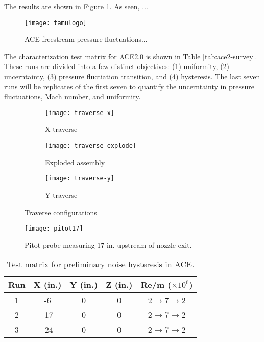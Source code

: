 The results are shown in Figure \ref{fig:ace-survey}. As seen, ...

\begin{figure}[ht!]
    \centering
    \texttt{[image: tamulogo]}
    \caption{ACE freestream pressure fluctuations...}
    \label{fig:ace-survey}
\end{figure}

The characterization test matrix for ACE2.0 is shown in Table \ref{tab:ace2-survey}. These runs are divided into a few distinct objectives: (1) uniformity, (2) uncerntainty, (3) pressure fluctiation transition, and (4) hysteresis. The last seven runs will be replicates of the first seven to quantify the uncerntainty in pressure fluctuations, Mach number, and uniformity.

\begin{figure}[ht!]
    \centering
    \begin{subfigure}[b]{0.4\textwidth}
            \texttt{[image: traverse-x]}
        \caption{X traverse}
        \label{fig:traverse-x}
    \end{subfigure}
    \begin{subfigure}[b]{0.22\textwidth}
            \texttt{[image: traverse-explode]}
        \caption{Exploded assembly}
        \label{fig:traverse-explode}
    \end{subfigure}
    \begin{subfigure}[b]{0.35\textwidth}
            \texttt{[image: traverse-y]}
        \caption{Y-traverse}
        \label{fig:traverse-y}
    \end{subfigure}
    \caption{Traverse configurations}
    \label{fig:traverse}
\end{figure}

\begin{figure}[ht!]
    \centering
    \texttt{[image: pitot17]}
    \caption{Pitot probe measuring 17 in. upstream of nozzle exit.}
    \label{fig:pitot17}
\end{figure}

\begin{table}[ht!]
    \centering
    \begin{tabular}{|c|c|c|c|c|}
        \hline
    \textbf{Run} & \textbf{X (in.)} & \textbf{Y (in.)} & \textbf{Z (in.)} & \textbf{Re/m ($\times10^6$)} \\ \hline
        1 & -6 & 0 & 0 & 2$\to$7$\to$2 \\ \hline
        2 & -17 & 0 & 0 & 2$\to$7$\to$2 \\ \hline
        3 & -24 & 0 & 0 & 2$\to$7$\to$2 \\ \hline
    \end{tabular}
    \caption{Test matrix for preliminary noise hysteresis in ACE.}
    \label{tab:ace-survey}
\end{table}

